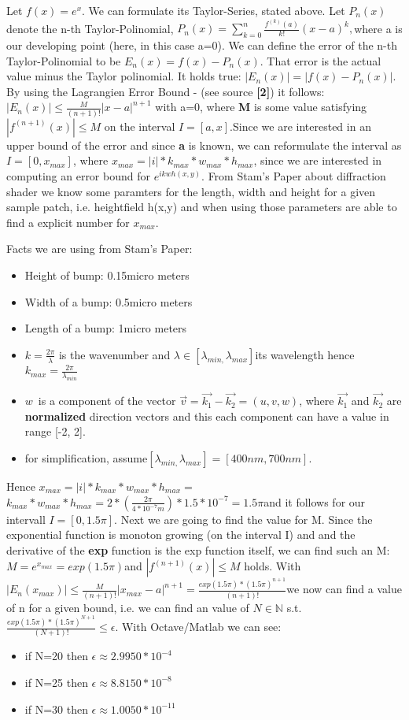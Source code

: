 Let $f(x)=e^{x}$. We can formulate its Taylor-Series, stated above.
Let $P_{n}(x)$denote the n-th Taylor-Polinomial, $P_{n}(x)=\sum_{k=0}^{n}\frac{f^{(k)}(a)}{k!}(x-a)^{k},$where
a is our developing point (here, in this case a=0). We can define
the error of the n-th Taylor-Polinomial to be $E_{n}(x)=f(x)-P_{n}(x)$.
That error is the actual value minus the Taylor polinomial. It holds
true: $|E_{n}(x)|=|f(x)-P_{n}(x)|$. By using the Lagrangien Error
Bound - (see source \textbf{{[}2{]}}) it follows: $|E_{n}(x)|\leq\frac{M}{(n+1)!}|x-a|^{n+1}$
with a=0, where \textbf{M }is some value satisfying $|f^{(n+1)}(x)|\leq M$
on the interval $I=[a,x]$.Since we are interested in an upper bound
of the error and since \textbf{a} is known, we can reformulate the
interval as $I=[0,x_{max}]$, where $x_{max}=|i|*k_{max}*w_{max}*h_{max}$,
since we are interested in computing an error bound for $e^{ikwh(x,y)}$.
From Stam's Paper about diffraction shader we know some paramters
for the length, width and height for a given sample patch, i.e. heightfield
h(x,y) and when using those parameters are able to find a explicit
number for $x_{max}$.

Facts we are using from Stam's Paper:

\begin{itemize}
\item Height of bump: 0.15micro meters
\item Width of a bump: 0.5micro meters
\item Length of a bump: 1micro meters
\item $k=\frac{2\pi}{\lambda}$ is the wavenumber and $\lambda\in[\lambda_{min,}\lambda_{max}]$its
wavelength hence $k_{max}=\frac{2\pi}{\lambda_{min}}$ 
\item $w$~is a component of the vector $\vec{v}=\vec{k_{1}}-\vec{k_{2}}=(u,v,w)$,
where $\vec{k_{1}}$ and $\vec{k_{2}}$ are \textbf{normalized} direction
vectors and this each component can have a value in range {[}-2, 2{]}.
\item for simplification, assume$[\lambda_{min,}\lambda_{max}]=[400nm,700nm].$
\end{itemize}

Hence $x_{max}=|i|*k_{max}*w_{max}*h_{max}=$$k_{max}*w_{max}*h_{max}=2*(\frac{2\pi}{4*10^{-7}m})*1.5*10^{-7}=1.5\pi$and
it follows for our intervall $I=[0,1.5\pi]$. Next we are going to
find the value for M. Since the exponential function is monoton growing
(on the interval I) and and the derivative of the \textbf{exp} function
is the exp function itself, we can find such an M: $M=e^{x_{max}}=exp(1.5\pi)$and
$|f^{(n+1)}(x)|\leq M$ holds. With $|E_{n}(x_{max})|\leq\frac{M}{(n+1)!}|x_{max}-a|^{n+1}=\frac{exp(1.5\pi)*(1.5\pi)^{n+1}}{(n+1)!}$we
now can find a value of n for a given bound, i.e. we can find an value
of $N\mathbb{\in N}$ s.t. $\frac{exp(1.5\pi)*(1.5\pi)^{N+1}}{(N+1)!}\leq\epsilon$.
With Octave/Matlab we can see: 
\begin{itemize}
\item if N=20 then $\epsilon\approx2.9950*10^{-4}$
\item if N=25 then $\epsilon\approx8.8150*10^{-8}$
\item if N=30 then $\epsilon\approx1.0050*10^{-11}$
\end{itemize}


